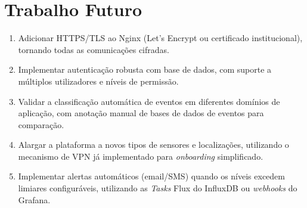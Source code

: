\documentclass[12pt,a4paper]{report}
\begin{document}
\section{Trabalho Futuro}

\begin{enumerate}[leftmargin=*, nosep, label=\textbf{\arabic*.}]
  \item Adicionar HTTPS/TLS ao Nginx (Let's Encrypt ou certificado institucional), tornando todas as comunicações cifradas.
  \item Implementar autenticação robusta com base de dados, com suporte a múltiplos utilizadores e níveis de permissão.
  \item Validar a classificação automática de eventos em diferentes domínios de aplicação, com anotação manual de bases de dados de eventos para comparação.
  \item Alargar a plataforma a novos tipos de sensores e localizações, utilizando o mecanismo de VPN já implementado para \textit{onboarding} simplificado.
  \item Implementar alertas automáticos (email/SMS) quando os níveis excedem limiares configuráveis, utilizando as \textit{Tasks} Flux do InfluxDB ou \textit{webhooks} do Grafana.
\end{enumerate}
\end{document}
